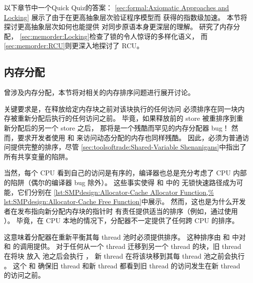 以下章节中一个Quick Quiz的答案：
\cref{sec:formal:Axiomatic Approaches and Locking}
展示了由于在更高抽象层次验证程序模型而
获得的指数级加速。
本节将探讨更高抽象层次如何也能提供
对同步原语本身更深层的理解。
研究了内存分配，
\cref{sec:memorder:Locking}检查了锁的令人惊讶的多样化语义，
而\cref{sec:memorder:RCU}则更深入地探讨了 RCU\@。

\subsection{内存分配}
\label{sec:memorder:Memory Allocation}

曾涉及内存分配，本节将对相关的内存排序问题进行展开讨论。

关键要求是，在释放给定内存块之前对该块执行的任何访问
必须排序在同一块内存被重新分配后执行的任何访问之前。
毕竟，如果释放前的 store 被重排序到重新分配后的另一个 store 之后，
那将是一个残酷而罕见的内存分配器 bug！
然而，要求开发者使用  和 
来访问动态分配的内存也同样残酷。
因此，必须为普通访问提供完整的排序，尽管
\cref{sec:toolsoftrade:Shared-Variable Shenanigans}中指出了
所有共享变量的陷阱。

当然，每个 CPU 看到自己的访问是有序的，编译器也总是充分考虑了
CPU 内部的陷阱（偶尔的编译器 bug 除外）。
这些事实使得  和  中的
无锁快速路径成为可能，它们分别在
\cref{lst:SMPdesign:Allocator-Cache Allocator Function,%
lst:SMPdesign:Allocator-Cache Free Function}中展示。
然而，这也是为什么开发者在发布指向新分配内存块的指针时
有责任提供适当的排序（例如，通过使用 ）。
毕竟，在 CPU 本地的情况下，分配器不一定提供了任何跨 CPU 的排序。

这意味着分配器在重新平衡其每 thread 池时必须提供排序。
这种排序由  和  中对
 和  的调用提供。
对于任何从一个 thread 迁移到另一个 thread 的块，旧 thread 在将块
放入  池之后会执行 ，
新 thread 在将该块移到其每 thread 池之前会执行
。
这个  和  确保旧 thread 和新 thread
都看到旧 thread 的访问发生在新 thread 的访问之前。

\QuickQuizEnd

